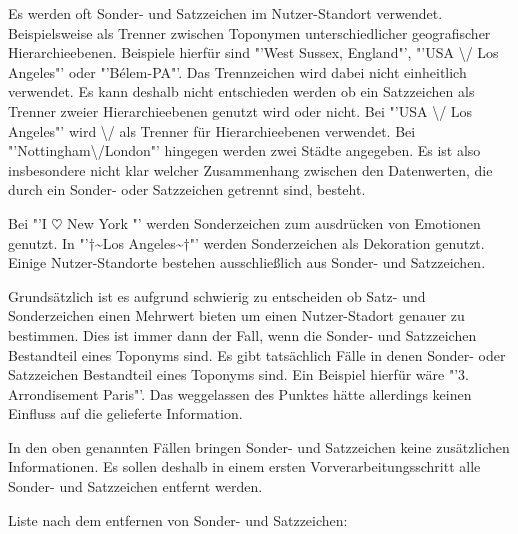 				Es werden oft Sonder- und Satzzeichen im Nutzer-Standort verwendet. 
				Beispielsweise als Trenner zwischen Toponymen unterschiedlicher geografischer Hierarchieebenen.
				Beispiele hierfür sind "'West Sussex, England"', "'USA \textbackslash/ Los Angeles"' oder "'Bélem-PA"'.
				Das Trennzeichen wird dabei nicht einheitlich verwendet.  
				Es kann deshalb nicht entschieden werden ob ein Satzzeichen als Trenner zweier Hierarchieebenen genutzt wird oder nicht.
				Bei "'USA \textbackslash/ Los Angeles"' wird \textbackslash/ als Trenner für Hierarchieebenen verwendet.
				Bei "'Nottingham\textbackslash/London"' hingegen werden zwei Städte angegeben.
				Es ist also insbesondere nicht klar welcher Zusammenhang zwischen den Datenwerten, die durch ein Sonder- oder Satzzeichen getrennt sind, besteht. 

				Bei "'I $\heartsuit$ New York "' werden Sonderzeichen zum ausdrücken von Emotionen genutzt.
				In "'$\dagger$\textasciitilde Los Angeles\textasciitilde$\dagger$"' werden Sonderzeichen als Dekoration genutzt.
				Einige Nutzer-Standorte bestehen ausschließlich aus Sonder- und Satzzeichen.
				
				Grundsätzlich ist es aufgrund schwierig zu entscheiden ob Satz- und Sonderzeichen einen Mehrwert bieten um einen Nutzer-Stadort genauer zu bestimmen.
				Dies ist immer dann der Fall, wenn die Sonder- und Satzzeichen Bestandteil eines Toponyms sind. 
				Es gibt tatsächlich Fälle in denen Sonder- oder Satzzeichen Bestandteil eines Toponyms sind.
				Ein Beispiel hierfür wäre "'3. Arrondisement Paris"'.
				Das weggelassen des Punktes hätte allerdings keinen Einfluss auf die gelieferte Information.

				In den oben genannten Fällen bringen Sonder- und Satzzeichen keine zusätzlichen Informationen.
				Es sollen deshalb in einem ersten Vorverarbeitungsschritt alle Sonder- und Satzzeichen entfernt werden. 

				Liste nach dem entfernen von Sonder- und Satzzeichen:


